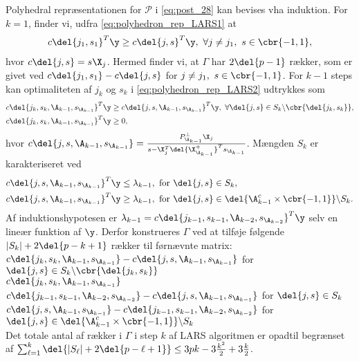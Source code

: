 Polyhedral repræsentationen for \(\mathcal{P}\) i \eqref{eq:post_28} kan bevises vha induktion.
For \(k=1\), finder vi, udfra \eqref{eq:polyhedron_rep_LARS1} at
\begin{align*}
c \del{j_1, s_1}^T \y \geq c \del{j,s}^T \y, \ \forall j \neq j_1, \ s \in \cbr{-1,1},
\end{align*}
hvor \(c \del{j,s} = s \X_j\).
Hermed finder vi, at \(\Gamma\) har \(2 \del{p-1}\) rækker, som er givet ved \(c \del{j_1, s_1} - c \del{j, s}\) for \(j \neq j_1, \ s \in \cbr{-1,1}\).
For \(k-1\) steps kan optimaliteten af \(j_k\) og \(s_k\) i \eqref{eq:polyhedron_rep_LARS2} udtrykkes som
\begin{align*}
c \del{j_k, s_k, \A_{k-1}, s_{\A_{k-1}}}^T \y &\geq c \del{j, s, \A_{k-1}, s_{\A_{k-1}}}^T \y, \ \forall \del{j,s} \in S_k \backslash \cbr{\del{j_k, s_k}}, \\
c \del{j_k, s_k, \A_{k-1}, s_{\A_{k-1}}}^T \y &\geq 0,
\end{align*}
hvor \(c \del{j, s, \A_{k-1}, s_{\A_{k-1}}} = \frac{P_{\A_{k-1}}^\perp \X_j}{s - \X_j^T \del{\X_{\A_{k-1}}^+}^T s_{\A_{k-1}}}\).
Mængden \(S_k\) er karakteriseret ved
\begin{align*}
c \del{j, s, \A_{k-1}, s_{\A_{k-1}}}^T \y &\leq \lambda_{k-1}, \ \text{for } \del{j,s} \in S_k, \\
c \del{j, s, \A_{k-1}, s_{\A_{k-1}}}^T \y &\geq \lambda_{k-1}, \ \text{for } \del{j,s} \in \del{\A_{k-1}^c \times \cbr{-1,1}} \backslash S_k.
\end{align*}
Af induktionshypotesen er \(\lambda_{k-1} = c \del{j_{k-1}, s_{k-1}, \A_{k-2}, s_{\A_{k-2}}}^T \y\) selv en lineær funktion af \(\y\).
Derfor konstrueres \(\Gamma\) ved at tilføje følgende \(\vert S_k \vert + 2 \del{p-k+1}\) rækker til førnævnte matrix: 
\(c \del{j_k, s_k, \A_{k-1}, s_{\A_{k-1}}} - c \del{j, s, \A_{k-1}, s_{\A_{k-1}}}\) for \(\del{j,s} \in S_k \backslash \cbr{\del{j_k, s_k}}\) \\
\(c \del{j_k, s_k, \A_{k-1}, s_{\A_{k-1}}}\) \\
\(c \del{j_{k-1}, s_{k-1}, \A_{k-2}, s_{\A_{k-2}}}  - c \del{j, s, \A_{k-1}, s_{\A_{k-1}}}\) for \(\del{j,s} \in S_k\) \\
\(c \del{j, s, \A_{k-1}, s_{\A_{k-1}}} - c \del{j_{k-1}, s_{k-1}, \A_{k-2}, s_{\A_{k-2}}}\) for \(\del{j,s} \in \del{\A_{k-1}^c \times \cbr{-1,1}} \backslash S_k\) \\
Det totale antal af rækker i \(\Gamma\) i step \(k\) af LARS algoritmen er opadtil begrænset af \(\sum_{\ell=1}^k \del{\vert S_\ell \vert + 2 \del{p - \ell + 1}} \leq 3 pk - 3 \frac{k^2}{2} + 3 \frac{k}{2}\).